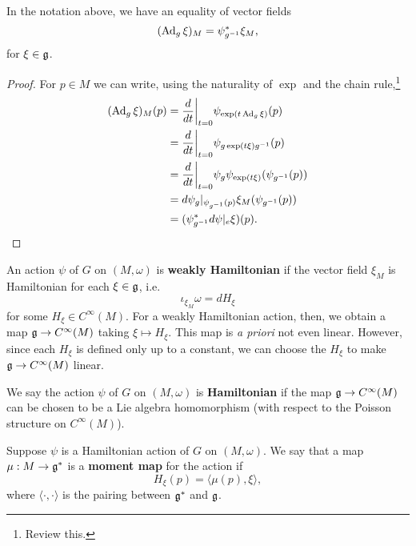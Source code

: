 \documentclass{amsart}
\begin{document}
\begin{lemma}
    In the notation above, we have an equality of vector fields
    \begin{equation*}
        (\operatorname{Ad}_g\xi)_M = \psi_{g^{-1}}^*\xi_M,
    \end{equation*}
    for $\xi\in\mathfrak g$.
\end{lemma}
\begin{proof}
    For $p\in M$ we can write, using the naturality of $\exp$ and the chain rule,\footnote{Review this.}
    \begin{align*}
        (\operatorname{Ad}_g\xi)_M(p) &= \frac{d}{dt}\bigg|_{t=0}\psi_{\exp(t\operatorname{Ad}_g\xi)}(p)\\
        &= \frac{d}{dt}\bigg|_{t=0}\psi_{g\exp(t\xi)g^{-1}}(p)\\
        &= \frac{d}{dt}\bigg|_{t=0}\psi_g\psi_{\exp(t\xi)}(\psi_{g^{-1}}(p))\\
        &= d\psi_g|_{\psi_{g^{-1}}(p)}\xi_M(\psi_{g^{-1}}(p))\\
        &= (\psi^*_{g^{-1}}d\psi|_e\xi)(p).
    \end{align*}
\end{proof}

\begin{definition}
    An action $\psi$ of $G$ on $(M,\omega)$ is \textbf{weakly Hamiltonian} if the vector
    field $\xi_M$ is Hamiltonian for each $\xi\in\mathfrak g$, i.e.
    \begin{equation*}
        \iota_{\xi_M}\omega = dH_\xi
    \end{equation*}
    for some $H_\xi\in C^\infty(M)$. For a weakly Hamiltonian action, then, we obtain a map
    $\mathfrak g\to C^\infty(M)$ taking $\xi\mapsto H_\xi$. This map is \textit{a priori} not even
    linear. However, since each $H_\xi$ is defined only up to a constant, we can choose the
    $H_\xi$ to make $\mathfrak g\to C^\infty(M)$ linear.

    We say the action $\psi$ of $G$ on $(M,\omega)$ is \textbf{Hamiltonian} if the map
    $\mathfrak g\to C^\infty(M)$ can be chosen to be a Lie algebra homomorphism (with respect
    to the Poisson structure on $C^\infty(M)$).
\end{definition}

\begin{definition}
    Suppose $\psi$ is a Hamiltonian action of $G$ on $(M,\omega)$. We say that a map
    $\mu:M\to\mathfrak g^*$ is a \textbf{moment map} for the action if
    \begin{equation*}
        H_\xi(p) = \langle \mu(p), \xi\rangle,
    \end{equation*}
    where $\langle\cdot,\cdot\rangle$ is the pairing between $\mathfrak g^*$ and $\mathfrak g$.
\end{definition}
\end{document}
